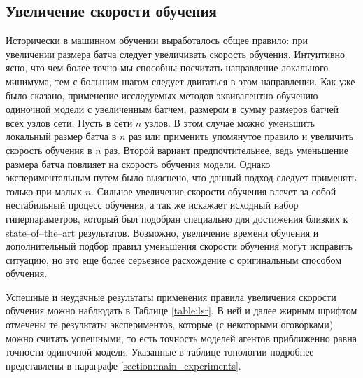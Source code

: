 \documentclass[a4paper,article,14pt]{extarticle}
\begin{document}
\subsection{Увеличение скорости обучения}
Исторически в машинном обучении выработалось \cite{lr_batch} общее правило: при увеличении размера батча следует увеличивать скорость обучения. Интуитивно ясно, что чем более точно мы способны посчитать направление локального минимума, тем с большим шагом следует двигаться в этом направлении. Как уже было сказано, применение исследуемых методов эквивалентно обучению одиночной модели с увеличенным батчем, размером в сумму размеров батчей всех узлов сети. Пусть в сети $n$ узлов. В этом случае можно уменьшить локальный размер батча в $n$ раз или применить упомянутое правило и увеличить скорость обучения в $n$ раз. Второй вариант предпочтительнее, ведь уменьшение размера батча повлияет на скорость обучения модели. Однако экспериментальным путем было выяснено, что данный подход следует применять только при малых $n$. Сильное увеличение скорости обучения влечет за собой нестабильный процесс обучения, а так же искажает исходный набор гиперпараметров, который был подобран специально для достижения близких к state--of--the--art результатов. Возможно, увеличение времени обучения и дополнительный подбор правил уменьшения скорости обучения могут исправить ситуацию, но это еще более серьезное расхождение с оригинальным способом обучения.

Успешные и неудачные результаты применения правила увеличения скорости обучения можно наблюдать в Таблице \ref{table:lsr}. В ней и далее жирным шрифтом отмечены те результаты экспериментов, которые (с некоторыми оговорками) можно считать успешными, то есть точность моделей агентов приближенно равна точности одиночной модели. Указанные в таблице топологии подробнее представлены в параграфе \ref{section:main_experiments}.
\end{document}
